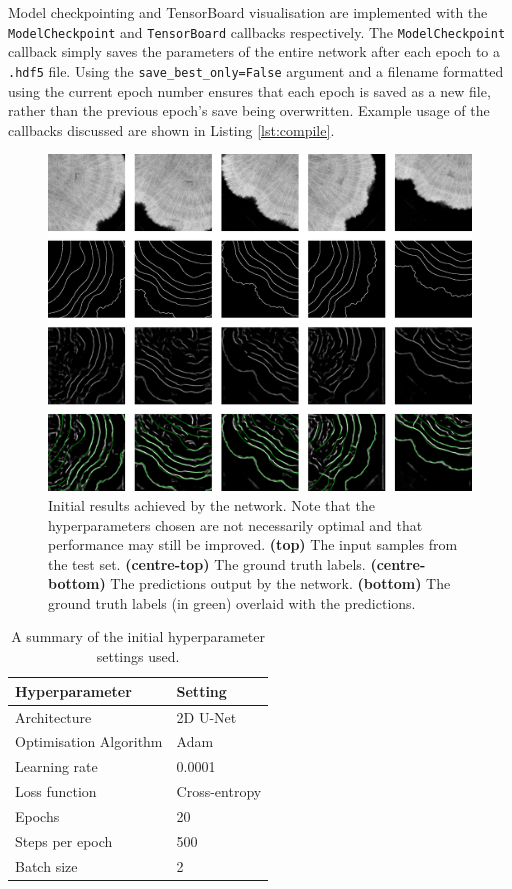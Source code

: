 Model checkpointing and TensorBoard visualisation are implemented with the \texttt{ModelCheckpoint} and \texttt{TensorBoard} callbacks respectively. The \texttt{ModelCheckpoint} callback simply saves the parameters of the entire network after each epoch to a \texttt{.hdf5} file. Using the \texttt{save\_best\_only=False} argument and a filename formatted using the current epoch number ensures that each epoch is saved as a new file, rather than the previous epoch's save being overwritten. Example usage of the callbacks discussed are shown in Listing \ref{lst:compile}.

\begin{figure}[t]
    \centering
    \includegraphics[width=1\textwidth]{images/initial-results.png}
    \caption{Initial results achieved by the network. Note that the hyperparameters chosen are not necessarily optimal and that performance may still be improved. \textbf{(top)} The input samples from the test set. \textbf{(centre-top)} The ground truth labels. \textbf{(centre-bottom)} The predictions output by the network. \textbf{(bottom)} The ground truth labels (in green) overlaid with the predictions.}
    \label{fig:outputs}
\end{figure}

\begin{table}[t]
    \centering
    \caption{A summary of the initial hyperparameter settings used.}
    \begin{tabular}{@{}ll@{}}
    \toprule
    Hyperparameter   & Setting      \\ \midrule
    Architecture     & 2D U-Net   \\
    Optimisation Algorithm & Adam \\
    Learning rate & 0.0001 \\
    Loss function & Cross-entropy \\
    Epochs & 20 \\
    Steps per epoch & 500 \\
    Batch size & 2 \\ \bottomrule
    \end{tabular}
    \label{tab:initialhyperparams}
\end{table}

